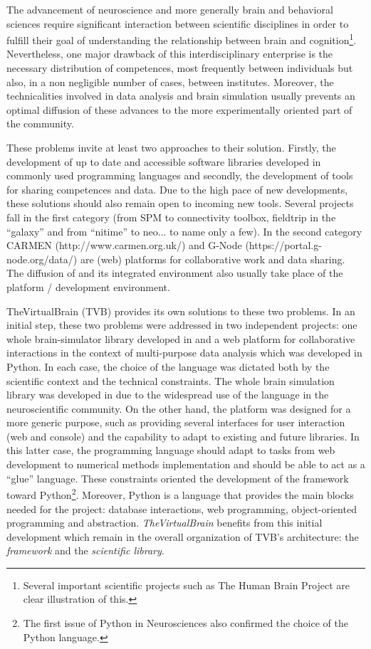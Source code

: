The advancement of neuroscience and more generally brain and behavioral sciences require
significant interaction between scientific disciplines in order to fulfill their goal
of understanding the relationship between brain and cognition\footnote{Several
important scientific projects such as The Human Brain Project are clear
illustration of this.}. Nevertheless, one major drawback of this
interdisciplinary enterprise is the necessary distribution of competences, most
frequently between individuals but also, in a non negligible number of cases,
between institutes.  Moreover, the technicalities involved in data
analysis and brain simulation usually prevents an optimal diffusion of these
advances to the more experimentally oriented part of the community. 

These problems invite at least two approaches to their solution. Firstly,  the
development of up to date and accessible software libraries developed in commonly
used programming languages and secondly, the development of tools for sharing
competences and data. Due to the high pace of new developments, these solutions
should also remain open to incoming new tools. Several projects fall in the
first category (from SPM to connectivity toolbox, fieldtrip in the \matlab{} ``galaxy''
and from ``nitime'' to neo... to name only a few). In the second category CARMEN
(http://www.carmen.org.uk/) and G-Node (https://portal.g-node.org/data/)
 are (web) platforms for collaborative work and data
sharing. The diffusion of \matlab{} and its integrated environment also usually
take place of the platform / development environment. 

TheVirtualBrain (TVB) provides its own solutions to these two problems.  In an
initial step, these two problems were addressed in two independent projects: one
whole brain-simulator library developed in \matlab{} and a web platform for
collaborative interactions in the context of multi-purpose data analysis which
was developed in Python.  In each case, the choice of the language was dictated
both by the scientific context and the technical constraints. The whole brain
simulation library was developed in \matlab{} due to the 
widespread use of the language in the neuroscientific community. On the
other hand, the platform was designed for a more generic purpose, such as providing several
interfaces for user interaction (web and console) and the capability to adapt
to existing and future libraries. In this latter case, the programming language
should adapt to tasks from  web development to numerical methods implementation
and should be able to act as a ``glue'' language. These constraints
 oriented the development of the framework toward
Python\footnote{The first issue of Python in Neurosciences also confirmed the
choice of the Python language.}.  Moreover, Python is a language that provides
the main blocks needed for the project: database interactions, web programming,
object-oriented programming and abstraction. \emph{TheVirtualBrain} benefits
from this initial development which remain in the overall organization of TVB's
architecture: the \emph{framework} and the \emph{scientific library}.

